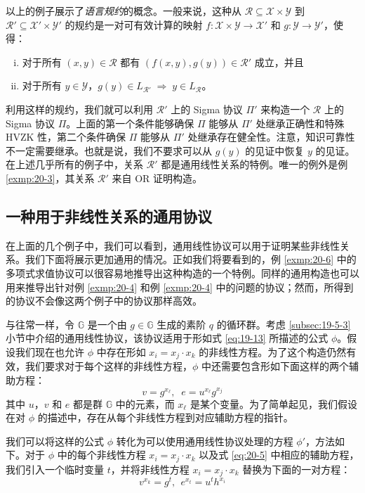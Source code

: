以上的例子展示了\emph{语言规约}的概念。一般来说，这种从 $\mathcal{R}\subseteq\mathcal{X}\times\mathcal{Y}$ 到 $\mathcal{R}'\subseteq\mathcal{X}'\times\mathcal{Y}'$ 的规约是一对可有效计算的映射 $f:\mathcal{X}\times\mathcal{Y}\to\mathcal{X}'$ 和 $g:\mathcal{Y}\to\mathcal{Y}'$，使得：
\begin{enumerate}[(i)]
	\item 对于所有 $(x,y)\in\mathcal{R}$ 都有 $(f(x,y),g(y))\in\mathcal{R}'$ 成立，并且
	\item 对于所有 $y\in\mathcal{Y}$，$g(y)\in L_{\mathcal{R}'}\; \Longrightarrow\; y\in L_{\mathcal R}$。
\end{enumerate}
利用这样的规约，我们就可以利用 $\mathcal{R}'$ 上的 Sigma 协议 $\Pi'$ 来构造一个 $\mathcal{R}$ 上的 Sigma 协议 $\Pi$。上面的第一个条件能够确保 $\Pi$ 能够从 $\Pi'$ 处继承正确性和特殊 HVZK 性，第二个条件确保 $\Pi$ 能够从 $\Pi'$ 处继承存在健全性。注意，知识可靠性不一定需要继承。也就是说，我们不要求可以从 $g(y)$ 的见证中恢复 $y$ 的见证。在上述几乎所有的例子中，关系 $\mathcal{R}'$ 都是通用线性关系的特例。唯一的例外是例 \ref{exmp:20-3}，其关系 $\mathcal{R}'$ 来自 OR 证明构造。

\subsection{一种用于非线性关系的通用协议}\label{subsec:20-2-1}

在上面的几个例子中，我们可以看到，通用线性协议可以用于证明某些非线性关系。我们下面将展示更加通用的情况。正如我们将要看到的，例 \ref{exmp:20-6} 中的多项式求值协议可以很容易地推导出这种构造的一个特例。同样的通用构造也可以用来推导出针对例 \ref{exmp:20-4} 和例 \ref{exmp:20-4} 中的问题的协议；然而，所得到的协议不会像这两个例子中的协议那样高效。

与往常一样，令 $\mathbb{G}$ 是一个由 $g\in\mathbb{G}$ 生成的素阶 $q$ 的循环群。考虑 \ref{subsec:19-5-3} 小节中介绍的通用线性协议，该协议适用于形如式 \ref{eq:19-13} 所描述的公式 $\phi$。假设我们现在也允许 $\phi$ 中存在形如 $x_i=x_j\cdot x_k$ 的非线性方程。为了这个构造仍然有效，我们要求对于每个这样的非线性方程，$\phi$ 中还需要包含形如下面这样的两个辅助方程：
\begin{equation}\label{eq:20-5}
v=g^{x_\ell},\;\;
e=u^{x_\ell}g^{x_j}
\end{equation}
其中 $u$，$v$ 和 $e$ 都是群 $\mathbb{G}$ 中的元素，而 $x_\ell$ 是某个变量。为了简单起见，我们假设在对 $\phi$ 的描述中，存在从每个非线性方程到对应辅助方程的指针。

我们可以将这样的公式 $\phi$ 转化为可以使用通用线性协议处理的方程 $\phi'$，方法如下。对于 $\phi$ 中的每个非线性方程 $x_i=x_j\cdot x_k$ 以及式 \ref{eq:20-5} 中相应的辅助方程，我们引入一个临时变量 $t$，并将非线性方程 $x_i=x_j\cdot x_k$ 替换为下面的一对方程：
\begin{equation}\label{eq:20-6}
v^{x_k}=g^t,~~
e^{x_t}=u^th^{x_i}
\end{equation}

